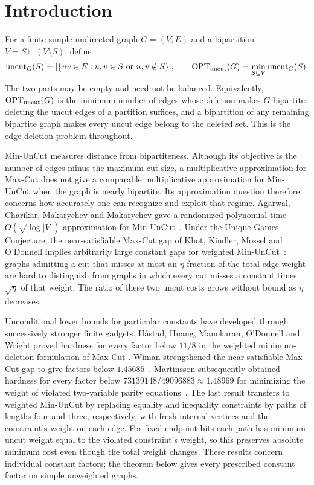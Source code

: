 \section{Introduction}
\label{sec:introduction}

For a finite simple undirected graph $G=(V,E)$ and a bipartition
$V=S\sqcup(V\setminus S)$, define
\[
 \operatorname{uncut}_G(S)=\lvert\{uv\in E:u,v\in S\text{ or }u,v\notin S\}\rvert,
 \qquad
 \operatorname{OPT}_{\rm uncut}(G)=\min_{S\subseteq V}\operatorname{uncut}_G(S).
\]
The two parts may be empty and need not be balanced. Equivalently,
$\operatorname{OPT}_{\rm uncut}(G)$ is the minimum number of edges whose deletion makes
$G$ bipartite: deleting the uncut edges of a partition suffices, and a
bipartition of any remaining bipartite graph makes every uncut edge belong
to the deleted set. This is the edge-deletion problem throughout.

Min-UnCut measures distance from bipartiteness. Although its objective is the
number of edges minus the maximum cut size, a multiplicative approximation
for Max-Cut does not give a comparable multiplicative approximation for
Min-UnCut when the graph is nearly bipartite. Its approximation question
therefore concerns how accurately one can recognize and exploit that regime.
Agarwal, Charikar, Makarychev and Makarychev gave a randomized polynomial-time
$O(\sqrt{\log |V|})$ approximation for Min-UnCut~\cite[Theorem~2.1]{ACMM2005}.
Under the Unique Games Conjecture, the near-satisfiable Max-Cut gap of
Khot, Kindler, Mossel and O'Donnell implies arbitrarily large constant
gaps for weighted Min-UnCut~\cite{KKMO2007}: graphs admitting a cut that
misses at most an $\eta$ fraction of the total edge weight are hard to
distinguish from graphs in which every cut misses a constant times
$\sqrt\eta$ of that weight. The ratio of these two
uncut costs grows without bound as $\eta$ decreases.

Unconditional lower bounds for particular constants have developed through
successively stronger finite gadgets. H\aa stad, Huang, Manokaran,
O'Donnell and Wright proved hardness for every factor below $11/8$ in the
weighted minimum-deletion formulation of Max-Cut
\cite[Corollary~3.3]{HHMOW2017}. Wiman strengthened the near-satisfiable
Max-Cut gap to give factors below $1.45685$~\cite[Theorem~3.18]{Wiman2018}.
Martinsson subsequently obtained hardness for every factor below
$73139148/49096883\approx1.48969$ for minimizing the weight of violated
two-variable parity equations~\cite[Theorem~1.1]{Martinsson2024}.
The last result transfers to weighted Min-UnCut by replacing equality and
inequality constraints by paths of lengths four and three, respectively,
with fresh internal vertices and the constraint's weight on each edge.
For fixed endpoint bits each path has minimum uncut weight equal to the
violated constraint's weight, so this preserves absolute minimum cost even
though the total weight changes. These results concern individual constant
factors; the theorem below gives every prescribed constant factor on simple
unweighted graphs.

